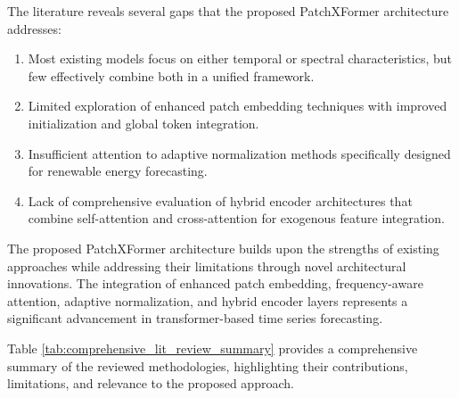 \documentclass[12pt]{uomthesis}
\begin{document}
The literature reveals several gaps that the proposed PatchXFormer architecture addresses:

\begin{enumerate}
\item Most existing models focus on either temporal or spectral characteristics, but few effectively combine both in a unified framework.

\item Limited exploration of enhanced patch embedding techniques with improved initialization and global token integration.

\item Insufficient attention to adaptive normalization methods specifically designed for renewable energy forecasting.

\item Lack of comprehensive evaluation of hybrid encoder architectures that combine self-attention and cross-attention for exogenous feature integration.
\end{enumerate}

The proposed PatchXFormer architecture builds upon the strengths of existing approaches while addressing their limitations through novel architectural innovations. The integration of enhanced patch embedding, frequency-aware attention, adaptive normalization, and hybrid encoder layers represents a significant advancement in transformer-based time series forecasting.

Table \ref{tab:comprehensive_lit_review_summary} provides a comprehensive summary of the reviewed methodologies, highlighting their contributions, limitations, and relevance to the proposed approach.
\end{document}
